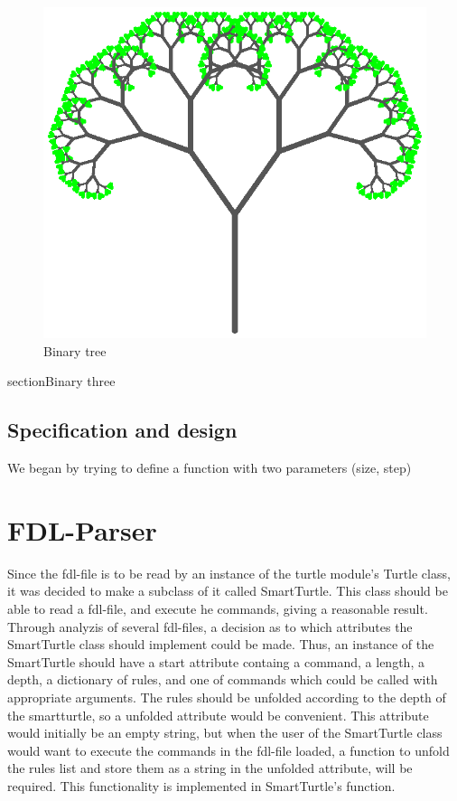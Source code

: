 \documentclass[titlepage]{article}
\begin{document}
\begin{figure}[H]
  \centering
  \includegraphics{bintree}
  \caption{Binary tree}
\end{figure}
section{Binary three}
\subsection{Specification and design}
We began by trying to define a function with two parameters (size, step)
\section{FDL-Parser}
Since the fdl-file is to be read by an instance of the turtle module's Turtle class, it was decided to make a subclass of it called SmartTurtle. This class should be able to read a fdl-file, and execute he commands, giving a reasonable result. Through analyzis of several fdl-files, a decision as to which attributes the SmartTurtle class should implement could be made. Thus, an instance of the SmartTurtle should have a start attribute containg a command, a length, a depth, a dictionary of rules, and one of commands which could be called with appropriate arguments. The rules should be unfolded according to the depth of the smartturtle, so a unfolded attribute would be convenient. This attribute would initially be an empty string, but when the user of the SmartTurtle class would want to execute the commands in the fdl-file loaded, a function to unfold the rules list and store them as a string in the unfolded attribute, will be required. This functionality is implemented in SmartTurtle's  function.
\end{document}

